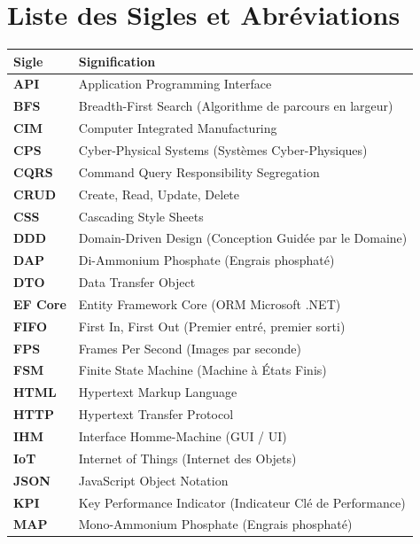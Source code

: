 ﻿\chapter*{Liste des Sigles et Abréviations}

\begin{table}[htbp]
\centering
\begin{tabularx}{\textwidth}{l p{12cm}}
\toprule
\textbf{Sigle} & \textbf{Signification} \\
\midrule
\textbf{API} & Application Programming Interface \\
\textbf{BFS} & Breadth-First Search (Algorithme de parcours en largeur) \\
\textbf{CIM} & Computer Integrated Manufacturing \\
\textbf{CPS} & Cyber-Physical Systems (Systèmes Cyber-Physiques) \\
\textbf{CQRS} & Command Query Responsibility Segregation \\
\textbf{CRUD} & Create, Read, Update, Delete \\
\textbf{CSS} & Cascading Style Sheets \\
\textbf{DDD} & Domain-Driven Design (Conception Guidée par le Domaine) \\
\textbf{DAP} & Di-Ammonium Phosphate (Engrais phosphaté) \\
\textbf{DTO} & Data Transfer Object \\
\textbf{EF Core} & Entity Framework Core (ORM Microsoft .NET) \\
\textbf{FIFO} & First In, First Out (Premier entré, premier sorti) \\
\textbf{FPS} & Frames Per Second (Images par seconde) \\
\textbf{FSM} & Finite State Machine (Machine à États Finis) \\
\textbf{HTML} & Hypertext Markup Language \\
\textbf{HTTP} & Hypertext Transfer Protocol \\
\textbf{IHM} & Interface Homme-Machine (GUI / UI) \\
\textbf{IoT} & Internet of Things (Internet des Objets) \\
\textbf{JSON} & JavaScript Object Notation \\
\textbf{KPI} & Key Performance Indicator (Indicateur Clé de Performance) \\
\textbf{MAP} & Mono-Ammonium Phosphate (Engrais phosphaté) \\

\end{tabularx}
\end{table}
